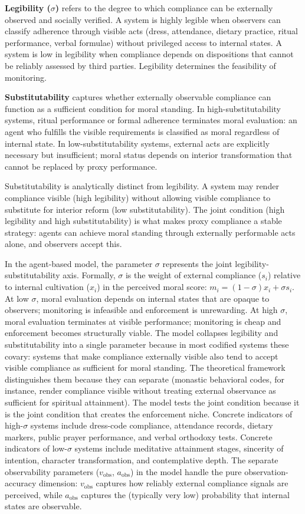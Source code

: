 \documentclass[12pt]{article}
\begin{document}
\textbf{Legibility ($\sigma$)} refers to the degree to which compliance can be externally observed and socially verified. A system is highly legible when observers can classify adherence through visible acts (dress, attendance, dietary practice, ritual performance, verbal formulae) without privileged access to internal states. A system is low in legibility when compliance depends on dispositions that cannot be reliably assessed by third parties. Legibility determines the feasibility of monitoring.

\textbf{Substitutability} captures whether externally observable compliance can function as a sufficient condition for moral standing. In high-substitutability systems, ritual performance or formal adherence terminates moral evaluation: an agent who fulfills the visible requirements is classified as moral regardless of internal state. In low-substitutability systems, external acts are explicitly necessary but insufficient; moral status depends on interior transformation that cannot be replaced by proxy performance.

Substitutability is analytically distinct from legibility. A system may render compliance visible (high legibility) without allowing visible compliance to substitute for interior reform (low substitutability). The joint condition (high legibility and high substitutability) is what makes proxy compliance a stable strategy: agents can achieve moral standing through externally performable acts alone, and observers accept this.

In the agent-based model, the parameter $\sigma$ represents the joint legibility-substitutability axis. Formally, $\sigma$ is the weight of external compliance ($s_i$) relative to internal cultivation ($x_i$) in the perceived moral score: $m_i = (1 - \sigma)x_i + \sigma s_i$. At low $\sigma$, moral evaluation depends on internal states that are opaque to observers; monitoring is infeasible and enforcement is unrewarding. At high $\sigma$, moral evaluation terminates at visible performance; monitoring is cheap and enforcement becomes structurally viable. The model collapses legibility and substitutability into a single parameter because in most codified systems these covary: systems that make compliance externally visible also tend to accept visible compliance as sufficient for moral standing. The theoretical framework distinguishes them because they can separate (monastic behavioral codes, for instance, render compliance visible without treating external observance as sufficient for spiritual attainment). The model tests the joint condition because it is the joint condition that creates the enforcement niche. Concrete indicators of high-$\sigma$ systems include dress-code compliance, attendance records, dietary markers, public prayer performance, and verbal orthodoxy tests. Concrete indicators of low-$\sigma$ systems include meditative attainment stages, sincerity of intention, character transformation, and contemplative depth. The separate observability parameters ($v_{\text{obs}}$, $a_{\text{obs}}$) in the model handle the pure observation-accuracy dimension: $v_{\text{obs}}$ captures how reliably external compliance signals are perceived, while $a_{\text{obs}}$ captures the (typically very low) probability that internal states are observable.
\end{document}
